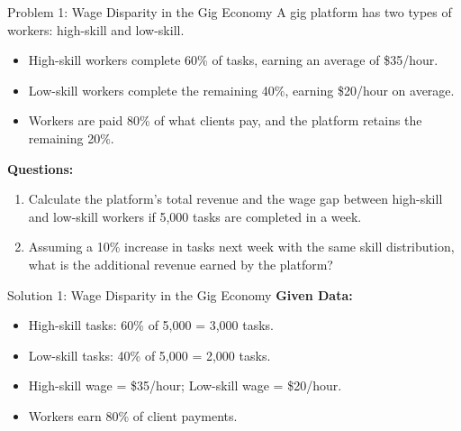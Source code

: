 \documentclass{beamer}
\begin{document}
\begin{frame}{Problem 1: Wage Disparity in the Gig Economy}
    A gig platform has two types of workers: high-skill and low-skill.
    \begin{itemize}
        \item High-skill workers complete 60\% of tasks, earning an average of \$35/hour.
        \item Low-skill workers complete the remaining 40\%, earning \$20/hour on average.
        \item Workers are paid 80\% of what clients pay, and the platform retains the remaining 20\%.
    \end{itemize}
    \textbf{Questions:}
    \begin{enumerate}
        \item Calculate the platform's total revenue and the wage gap between high-skill and low-skill workers if 5,000 tasks are completed in a week.
        \item Assuming a 10\% increase in tasks next week with the same skill distribution, what is the additional revenue earned by the platform?
    \end{enumerate}
\end{frame}

\begin{frame}{Solution 1: Wage Disparity in the Gig Economy}
    \textbf{Given Data:}
    \begin{itemize}
        \item High-skill tasks: 60\% of 5,000 = 3,000 tasks.
        \item Low-skill tasks: 40\% of 5,000 = 2,000 tasks.
        \item High-skill wage = \$35/hour; Low-skill wage = \$20/hour.
        \item Workers earn 80\% of client payments.
    \end{itemize}

\end{frame}
\end{document}
